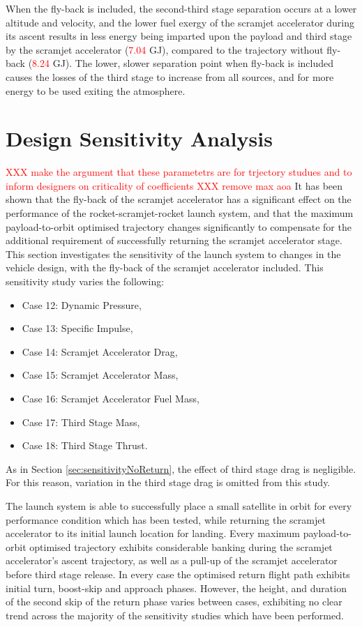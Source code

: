 When the fly-back is included, the second-third stage separation occurs at a lower altitude and velocity, and the lower fuel exergy of the scramjet accelerator during its ascent results in less energy being imparted upon the payload and third stage by the scramjet accelerator (\textcolor{red}{7.04} GJ), compared to the trajectory without fly-back (\textcolor{red}{8.24} GJ). 
The lower, slower separation point when fly-back is included causes the losses of the third stage to increase from all sources, and for more energy to be used exiting the atmosphere. 


\section{Design Sensitivity Analysis}\label{sec:sensitivity}

\textcolor{red}{XXX make the argument that these parametetrs are for trjectory studues and to inform designers on criticality of coefficients}
\textcolor{red}{XXX remove max aoa}
It has been shown that the fly-back of the scramjet accelerator has a significant effect on the performance of the rocket-scramjet-rocket launch system, and that the maximum payload-to-orbit optimised trajectory changes significantly to compensate for the additional requirement of successfully returning the scramjet accelerator stage. This section investigates the sensitivity of the launch system to changes in the vehicle design, with the fly-back of the scramjet accelerator included. This sensitivity study varies the following:
\begin{itemize}
	\item Case 12: Dynamic Pressure, 
	\item Case 13: Specific Impulse,
	\item Case 14: Scramjet Accelerator Drag,
	\item Case 15: Scramjet Accelerator Mass,
	\item Case 16: Scramjet Accelerator Fuel Mass,
	\item Case 17: Third Stage Mass,
	\item Case 18: Third Stage Thrust.
\end{itemize}
As in Section \ref{sec:sensitivityNoReturn}, the effect of third stage drag is negligible. For this reason, variation in the third stage drag is omitted from this study. 

The launch system is able to successfully place a small satellite in orbit for every performance condition which has been tested, while returning the scramjet accelerator to its initial launch location for landing. 
Every maximum payload-to-orbit optimised trajectory exhibits considerable banking during the scramjet accelerator's ascent trajectory, as well as a pull-up of the scramjet accelerator before third stage release. 
In every case the optimised return flight path exhibits initial turn, boost-skip and approach phases. 
However, the height, and duration of the second skip of the return phase varies between cases, exhibiting no clear trend across the majority of the sensitivity studies which have been performed.

